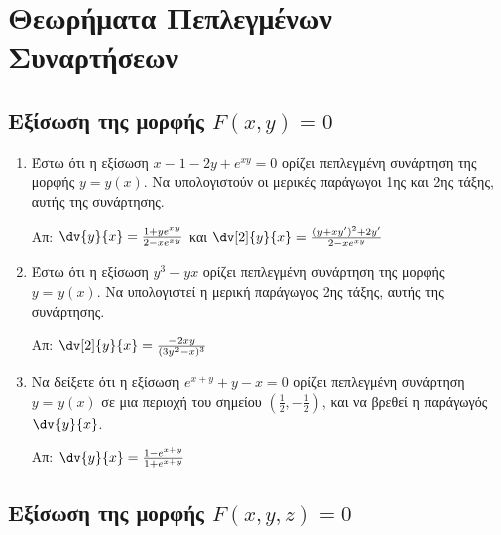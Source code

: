 \documentclass[a4paper,table]{report}
\begin{document}
\begin{center}
\end{center} 



\section*{Θεωρήματα Πεπλεγμένων Συναρτήσεων}

\subsection*{Εξίσωση της μορφής \ensuremath{F(x,y)=0}}

\begin{enumerate}
    \item Έστω ότι η εξίσωση $ x-1-2y+e^{xy} = 0 $ ορίζει πεπλεγμένη συνάρτηση της 
        μορφής $ y = y(x) $. Να υπολογιστούν οι μερικές παράγωγοι 
        1ης και 2ης τάξης, αυτής της συνάρτησης.

        \hfill Απ: $ \dv{y}{x} = \frac{1+ye^{xy}}{2-xe^{xy}} $ και $ \dv[2]{y}{x}
        = \frac{(y+xy')^{2}+2y'}{2-xe^{xy}} $ 

    \item Έστω ότι η εξίσωση $ y^{3} - yx $ ορίζει πεπλεγμένη συνάρτηση της 
        μορφής $ y = y(x) $. Να υπολογιστεί η μερική παράγωγος 2ης τάξης, αυτής 
        της συνάρτησης.

        \hfill Απ: $ \dv[2]{y}{x} = \frac{ -2xy }{ (3y^{2} - x)^{3} }  $ 

    \item Να δείξετε ότι η εξίσωση $ e^{x+y} + y- x = 0 $ ορίζει πεπλεγμένη συνάρτηση 
        $ y=y(x) $ σε μια περιοχή του σημείου $ \left(\frac{1}{2}, - 
        \frac{1}{2}\right) $, και να βρεθεί η παράγωγός $ \dv{y}{x} $.

        \hfill Απ: $ \dv{y}{x} = \frac{1-e^{x+y}}{1+e^{x+y}} $  
\end{enumerate}

\subsection*{Εξίσωση της μορφής \ensuremath{F(x,y,z)=0}}
\end{document}
